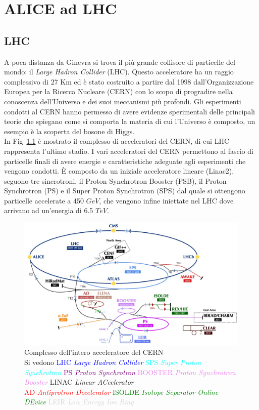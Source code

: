 \chapter{ALICE ad LHC}

\section{LHC}
A poca distanza da Ginevra si trova il più grande collisore di particelle del mondo: il \textit{Large Hadron Collider} (LHC). Questo acceleratore ha un raggio complessivo di 27 Km ed è stato costruito a partire dal 1998 dall'Organizzazione Europea per la Ricerca Nucleare (CERN) con lo scopo di progradire nella conoscenza dell'Universo e dei suoi meccanismi più profondi. Gli esperimenti condotti al CERN hanno permesso di avere evidenze sperimentali delle principali teorie che spiegano come si comporta la materia di cui l'Universo è composto, un esempio è la scoperta del bosone di Higgs. 
\\In Fig~\ref{fig:CERNcomplex} è mostrato il complesso di acceleratori del CERN, di cui LHC rappresenta l'ultimo stadio. I vari acceleratori del CERN permettono al fascio di particelle finali di avere energie e caratteristiche adeguate agli esperimenti che vengono condotti. È composto da un iniziale acceleratore lineare (Linac2), seguono tre sincrotroni, il Proton Synchrotron Booster (PSB), il Proton Synchrotron (PS) e il Super Proton Synchrotron (SPS) dal quale si ottengono particelle accelerate a 450 $GeV$, che vengono infine iniettate nel LHC dove arrivano ad un'energia di 6.5 $TeV$. 
 
    \begin{figure}[htbp]
        \centering
        \includegraphics[width=0.8\linewidth]{ALICE/CernComplex_2018.png}   
        \caption{Complesso dell'intero acceleratore del CERN \\\small{Si vedono  \textcolor{blue}{LHC \textit{Large Hadron Collider}} \textcolor{cyan}{SPS \textit{Super Proton Synchrotron}} \textcolor{purple}{ PS \textit{Proton Synchrotron}} \textcolor{violet}{BOOSTER \textit{ Proton Synchrotron Booster}} LINAC \textit{Linear ACcelerator}} \\{\footnotesize  \textcolor{red}{AD \textit{Antiprotron Decelerator}} \textcolor{green}{ISOLDE \textit{Isotope Separator Online DEvice}}  \textcolor{lightgray}{LEIR \textit{Low Energy Ion Ring}} }}
        \label{fig:CERNcomplex}
    \end{figure}
    
